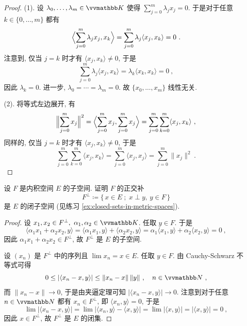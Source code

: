 \begin{proof}
    (1). 设 \(\lambda_0, \ldots, \lambda_m \in \K\) 使得 \(\sum_{j = 0}^m \lambda_j x_j = 0\). 于是对于任意 \(k \in \{0, \ldots, m\}\) 都有
    \[
        \Bigl\langle \sum_{j = 0}^m \lambda_j x_j, x_k \Bigr\rangle = \sum_{j = 0}^m \lambda_j \langle x_j, x_k \rangle = 0\ .
    \]
    注意到, 仅当 \(j = k\) 时才有 \(\langle x_j, x_k \rangle \neq 0\), 于是
    \[
        \sum_{j = 0}^m \lambda_j \langle x_j, x_k \rangle = \lambda_k \langle x_k, x_k \rangle = 0\ ,
    \]
    因此 \(\lambda_k = 0\). 进一步, \(\lambda_0 = \cdots = \lambda_m = 0\). 故 \(\{x_0, \ldots, x_m\}\) 线性无关.

    (2). 将等式左边展开, 有
    \[
        \Bigl\|\sum_{j = 0}^m x_j\Bigr\|^2 = \Bigl\langle \sum_{j = 0}^m x_j, \sum_{j = 0}^m x_j \Bigr\rangle = \sum_{j = 0}^m \sum_{k = 0}^m \langle x_j, x_k \rangle\ ,
    \]
    同样的, 仅当 \(j = k\) 时才有 \(\langle x_j, x_k \rangle \neq 0\), 于是
    \[
        \sum_{j = 0}^m \sum_{k = 0}^m \langle x_j, x_k \rangle = \sum_{j = 0}^m \langle x_j, x_j \rangle = \sum_{j = 0}^m \|x_j\|^2\ .
    \]
\end{proof}

\begin{exercise}
    设 \(F\) 是内积空间 \(E\) 的子空间. 证明 \(F\) 的正交补
    \[
        F^\perp \coloneqq \{\, x \in E \;;\; x \perp y,\ y \in F \,\}
    \]
    是 \(E\) 的闭子空间 (见练习 \ref{ex:closed-sets-in-metric-spaces}).
\end{exercise}

\begin{proof}
    设 \(x_1, x_2 \in F^\perp,\ \alpha_1, \alpha_2 \in \K\). 任取 \(y \in F\). 于是
    \[
        \langle \alpha_1 x_1 + \alpha_2 x_2, y \rangle = \langle \alpha_1 x_1, y \rangle + \langle \alpha_2 x_2, y \rangle = \alpha_1 \langle x_1, y \rangle + \alpha_2 \langle x_2, y \rangle = 0\ ,
    \]
    因此 \(\alpha_1 x_1 + \alpha_2 x_2 \in F^\perp\), 故 \(F^\perp\) 是 \(E\) 的子空间.

    设 \((x_n)\) 是 \(F^\perp\) 中的序列且 \(\lim x_n = x \in E\). 任取 \(y \in F\). 由 Cauchy-Schwarz 不等式可得
    \[
        0 \leq |\langle x_n - x, y \rangle| \leq \|x_n - x\|\, \|y\|\ ,\quad n \in \N\ ,
    \]
    而 \(\|x_n - x\| \to 0\), 于是由夹逼定理可知 \(|\langle x_n - x, y \rangle| \to 0\). 注意到对于任意 \(n \in \N\) 都有 \(x_n \in F^\perp\), 即 \(\langle x_n, y \rangle = 0\), 于是
    \[
        \lim |\langle x_n - x, y \rangle| = \lim |\langle x_n, y \rangle - \langle x, y \rangle| = \lim |\langle x, y \rangle| = |\langle x, y \rangle| = 0\ ,
    \]
    因此 \(x \in F^\perp\), 故 \(F^\perp\) 是 \(E\) 的闭集.
\end{proof}


